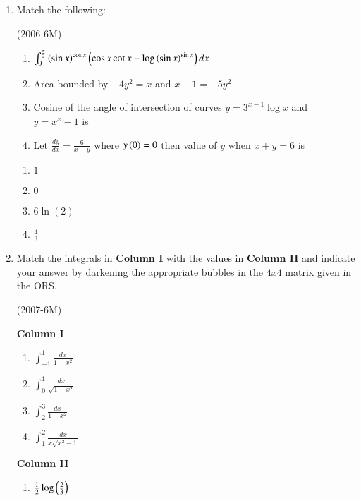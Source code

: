 \documentclass[journal,12pt,twocolumn]{IEEEtran}
\theoremstyle{remark}
\begin{document}
	\begin{enumerate}
		\item Match the following:

			\hfill{(2006-6M)}
			\begin{multicols}{2}
				\begin{enumerate}
				\item	$\int_{0}^{\frac{\pi}{2}} \left({\sin x}\right)^{\cos x} \left(\cos x\cot x-\log\left(\sin x\right)^{\sin x}\right) dx $
				\item Area bounded by $-4y^{2}=x$ and $x-1=-5y^{2}$
				\item Cosine of the angle of intersection of curves $y=3^{x-1}\log x$ and $y=x^{x}-1$ is
				\item Let $\frac{dy}{dx}=\frac{6}{x+y}$ where $y\left(0\right)=0$ then value of $y$ when $x+y=6$ is
				\end{enumerate}
			\columnbreak
				\begin{enumerate}
					\item $1$
						
					\item $0$

					\item $6\ln(2)$

					\item $\frac{4}{3}$
						
				\end{enumerate}
				\end{multicols}
			\item Match the integrals in \textbf{Column I} with the values in \textbf{Column II} and indicate your answer by darkening the appropriate bubbles in the $4x4$ matrix given in the ORS. 

			\hfill{(2007-6M)}
			\begin{multicols}{2}
				\textbf{Column I}

				\begin{enumerate}
					\item $\int_{-1}^{1}\frac{dx}{1+x^{2}}$
					\item $\int_{0}^{1}\frac{dx}{\sqrt{1-x^{2}}}$
					\item $\int_{2}^{3}\frac{dx}{1-x^{2}}$
					\item $\int_{1}^{2}\frac{dx}{x\sqrt{x^{2}-1}}$
				\end{enumerate}
			\columnbreak
				\textbf{Column II}
				\begin{enumerate}
					\item $\frac{1}{2}\log\left(\frac{2}{3}\right)$


\end{enumerate}
\end{multicols}
\end{enumerate}
\end{document}
